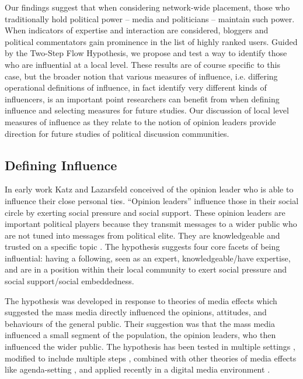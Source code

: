 \documentclass[a4paper,12pt]{article}
\begin{document}
Our findings suggest that when considering network-wide placement, those who traditionally hold political power – media and politicians – maintain such power. When indicators of expertise and interaction are considered, bloggers and political commentators gain prominence in the list of highly ranked users. Guided by the Two-Step Flow Hypothesis, we propose and test a way to identify those who are influential at a local level. These results are of course specific to this case, but the broader notion that various measures of influence, i.e. differing operational definitions of influence, in fact identify very different kinds of influencers, is an important point researchers can benefit from when defining influence and selecting measures for future studies. Our discussion of local level measures of influence as they relate to the notion of opinion leaders provide direction for future studies of political discussion communities.

\subsection{Defining Influence}

In early work Katz and Lazarsfeld conceived of the opinion leader who is able to influence their close personal ties. ``Opinion leaders'' influence those in their social circle by exerting social pressure and social support. These opinion leaders are important political players because they transmit messages to a wider public who are not tuned into messages from political elite. They are knowledgeable and trusted on a specific topic \cite{katzlazarsfeld}. The hypothesis suggests four core facets of being influential: having a following, seen as an expert, knowledgeable/have expertise, and are in a position within their local community to exert social pressure and social support/social embeddedness. 

The hypothesis was developed in response to theories of media effects which suggested the mass media directly influenced the opinions, attitudes, and behaviours of the general public. Their suggestion was that the mass media influenced a small segment of the population, the opinion leaders, who then influenced the wider public. The hypothesis has been tested in multiple settings \cite{katz}, modified to include multiple steps \cite{weimann, Robinson1976}, combined with other theories of media effects like agenda-setting \cite{brosiusweimann}, and applied recently in a digital media environment \citeyear{curticenorris}. 
\end{document}

